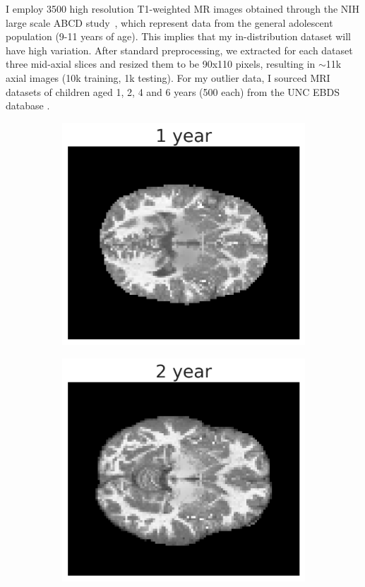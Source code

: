 I employ 3500 high resolution T1-weighted MR images obtained through the NIH large scale ABCD study~\cite{Casey2018adolescent}, which represent data from the general adolescent population (9-11 years of age). This implies that my in-distribution dataset will have high variation. After standard preprocessing, we extracted for each dataset three mid-axial slices and resized them to be 90x110 pixels, resulting in $\sim$11k axial images (10k  training, 1k testing). For my outlier data, I sourced MRI datasets of children aged 1, 2, 4 and 6 years (500 each) from the UNC EBDS database \cite{Stephens:2020bo,Gilmore:2020ct}.
\begin{figure}[tbhp]
\centering
\begin{subfigure}[b]{0.22\textwidth}
    \includegraphics[width=\textwidth]{figures/1_year.png}
    \label{fig:brain_1}
\end{subfigure}
\begin{subfigure}[b]{0.22\textwidth}
    \includegraphics[width=\textwidth]{figures/2_year.png}

\end{subfigure}
\end{figure}
